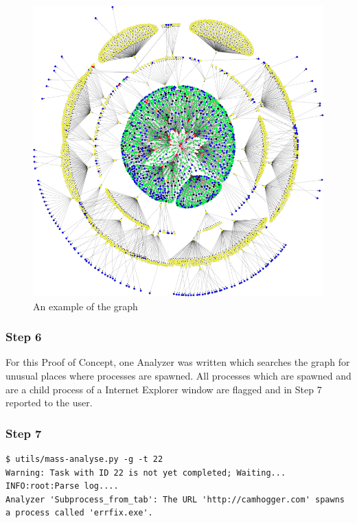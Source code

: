 \begin{figure}[h]
    \centering
    \includegraphics[width=17cm]{Images/graph2.png}
    \caption{An example of the graph}
    \label{fig:alg_tree}
\end{figure}
\subsubsection{Step 6}

For this Proof of Concept, one Analyzer was written which searches the graph for unusual places where processes are spawned. All processes which are spawned and are a child process of a Internet Explorer window are flagged and in Step 7 reported to the user.


\subsubsection{Step 7}

\begin{lstlisting}
$ utils/mass-analyse.py -g -t 22
Warning: Task with ID 22 is not yet completed; Waiting...
INFO:root:Parse log....
Analyzer 'Subprocess_from_tab': The URL 'http://camhogger.com' spawns a process called 'errfix.exe'.
\end{lstlisting}

